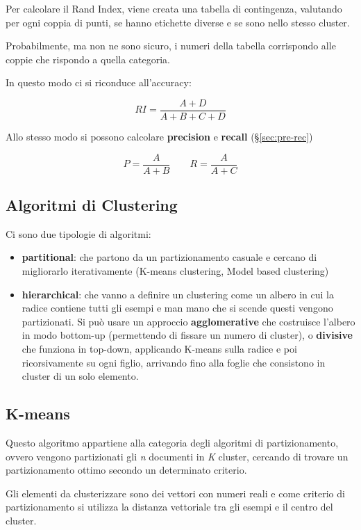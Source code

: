 Per calcolare il Rand Index, viene creata una tabella di contingenza, valutando per ogni coppia di
punti, se hanno etichette diverse e se sono nello stesso cluster.

Probabilmente, ma non ne sono sicuro, i numeri della tabella corrispondo
alle coppie che rispondo a quella categoria.

In questo modo ci si riconduce all'accuracy:

$$
RI =\frac{A + D}{A+B+C+D}
$$

Allo stesso modo si possono calcolare \textbf{precision} e
\textbf{recall} (§\ref{sec:pre-rec})

$$
P = \frac{A}{A+B} \qquad R = \frac{A}{A+C}
$$

\subsection{Algoritmi di Clustering}\label{algoritmi-di-clustering}

Ci sono due tipologie di algoritmi:

\begin{itemize}
\item
  \textbf{partitional}: che partono da un partizionamento casuale e
  cercano di migliorarlo iterativamente (K-means clustering, Model based
  clustering)
\item
  \textbf{hierarchical}: che vanno a definire un clustering come un
  albero in cui la radice contiene tutti gli esempi e man mano che si
  scende questi vengono partizionati. Si può usare un approccio
  \textbf{agglomerative} che costruisce l'albero in modo bottom-up
  (permettendo di fissare un numero di cluster), o \textbf{divisive} che
  funziona in top-down, applicando K-means sulla radice e poi
  ricorsivamente su ogni figlio, arrivando fino alla foglie che
  consistono in cluster di un solo elemento.
\end{itemize}

\subsection{K-means}\label{k-means}

Questo algoritmo appartiene alla categoria degli algoritmi di
partizionamento, ovvero vengono partizionati gli \emph{n} documenti in
\emph{K} cluster, cercando di trovare un partizionamento ottimo secondo
un determinato criterio.

Gli elementi da clusterizzare sono dei vettori con numeri reali e come
criterio di partizionamento si utilizza la distanza vettoriale tra gli
esempi e il centro del cluster.

